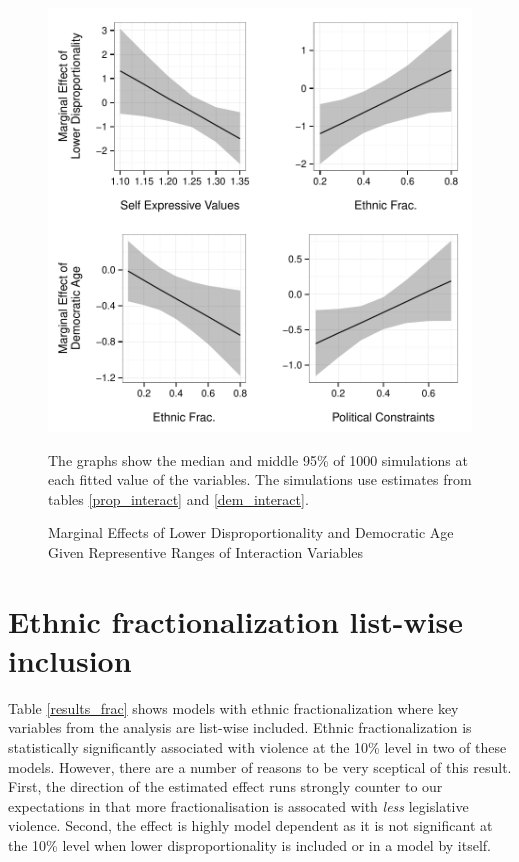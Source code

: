 \documentclass[a4paper]{article}\usepackage[]{graphicx}\usepackage[]{color}
\newenvironment{knitrout}{}{} %
\begin{document}
\begin{figure}
    \begin{center}
\begin{knitrout}
\color{fgcolor}
\includegraphics[width=0.95\linewidth]{figure/marginalEffects-1} 

\end{knitrout}
    \end{center}
    \caption{Marginal Effects of Lower Disproportionality and Democratic Age Given Representive Ranges of Interaction Variables}
    \label{marginal_effect_plot}
    \begin{singlespace}
      {\scriptsize{The graphs show the median and middle 95\% of 1000 simulations at each fitted value of the variables. The simulations use estimates from tables \ref{prop_interact} and \ref{dem_interact}.}}
    \end{singlespace}
\end{figure}


\section*{Ethnic fractionalization list-wise inclusion}


Table \ref{results_frac} shows models with ethnic fractionalization where key variables from the analysis are list-wise included. Ethnic fractionalization is statistically significantly associated with violence at the 10\% level in two of these models. However, there are a number of reasons to be very sceptical of this result. First, the direction of the estimated effect runs strongly counter to our expectations in that more fractionalisation is assocated with \emph{less} legislative violence. Second, the effect is highly model dependent as it is not significant at the 10\% level when lower disproportionality is included or in a model by itself. 
\end{document}
